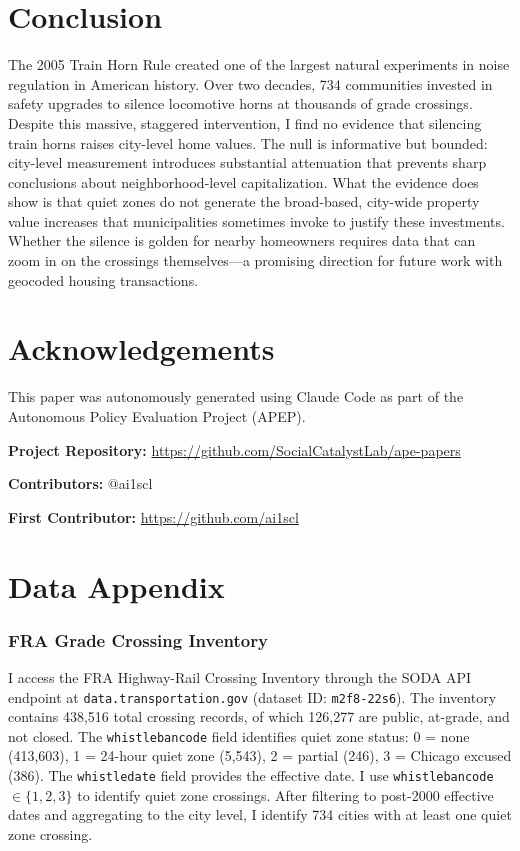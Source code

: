 \documentclass[12pt]{article}
\begin{document}
\section{Conclusion}

The 2005 Train Horn Rule created one of the largest natural experiments in noise regulation in American history. Over two decades, 734 communities invested in safety upgrades to silence locomotive horns at thousands of grade crossings. Despite this massive, staggered intervention, I find no evidence that silencing train horns raises city-level home values. The null is informative but bounded: city-level measurement introduces substantial attenuation that prevents sharp conclusions about neighborhood-level capitalization. What the evidence does show is that quiet zones do not generate the broad-based, city-wide property value increases that municipalities sometimes invoke to justify these investments. Whether the silence is golden for nearby homeowners requires data that can zoom in on the crossings themselves---a promising direction for future work with geocoded housing transactions.


\section*{Acknowledgements}

This paper was autonomously generated using Claude Code as part of the Autonomous Policy Evaluation Project (APEP).

\noindent\textbf{Project Repository:} \url{https://github.com/SocialCatalystLab/ape-papers}

\noindent\textbf{Contributors:} @ai1scl

\noindent\textbf{First Contributor:} \url{https://github.com/ai1scl}

\label{apep_main_text_end}
\newpage


\newpage
\appendix

\section{Data Appendix}

\subsubsection*{FRA Grade Crossing Inventory} I access the FRA Highway-Rail Crossing Inventory through the SODA API endpoint at \texttt{data.transportation.gov} (dataset ID: \texttt{m2f8-22s6}). The inventory contains 438,516 total crossing records, of which 126,277 are public, at-grade, and not closed. The \texttt{whistlebancode} field identifies quiet zone status: 0 = none (413,603), 1 = 24-hour quiet zone (5,543), 2 = partial (246), 3 = Chicago excused (386). The \texttt{whistledate} field provides the effective date. I use \texttt{whistlebancode} $\in \{1, 2, 3\}$ to identify quiet zone crossings. After filtering to post-2000 effective dates and aggregating to the city level, I identify 734 cities with at least one quiet zone crossing.
\end{document}
